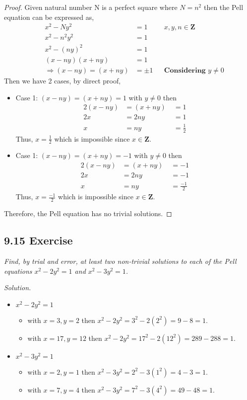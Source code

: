 \documentclass{article}
\begin{document}
\begin{proof}
Given natural number N is a perfect square where $N = n^2$ then the Pell equation can be expressed as,
\begin{align*}
    &&x^2 - Ny^2 &= 1 && x,y,n \in \mathbf{Z}\\
    &&x^2 - n^2y^2 &= 1 &&\\
    &&x^2 - (ny)^2 &= 1 &&\\
    &&(x - ny)(x + ny) &= 1 &&\\
    &&\Longrightarrow (x - ny) = (x + ny) &= \pm 1&& \textbf{Considering $y \neq 0$}
\end{align*}
Then we have 2 cases, by direct proof,
\begin{itemize}
    \item Case 1: $(x - ny) = (x + ny) = 1$ with $y \neq 0$ then
    \begin{alignat*}{2}
        (x - ny) &= (x+ny) \;&= 1\\
        2x &= 2ny \;&= 1\\
        x &= ny \;&= \frac{1}{2}
    \end{alignat*}
    Thus, $x = \frac{1}{2} $ which is impossible since $x \in \mathbf{Z}$.
    \item Case 1: $(x - ny) = (x + ny) = -1$ with $y \neq 0$ then
    \begin{alignat*}{2}
        (x - ny) &= (x+ny) \;&= -1\\
        2x &= 2ny \;&= -1\\
        x &= ny \;&= \frac{-1}{2}
    \end{alignat*}
    Thus, $x = \frac{-1}{2} $ which is impossible since $x \in \mathbf{Z}$.
\end{itemize}
Therefore, the Pell equation has no trivial solutions.
\end{proof}

\subsection*{9.15 Exercise} 
\quad \textit{Find, by trial and error, at least two non-trivial solutions to each of the Pell equations $x^2-2y^2=1$ and $x^2-3y^2=1$.}

\textit{Solution.}
\begin{itemize}
    \item $x^2-2y^2=1$ 
    \begin{itemize}
        \item with $x = 3, y = 2$ then $x^2-2y^2= 3^2-2(2^2) = 9 - 8 = 1$.
        \item with $x = 17, y = 12$ then $x^2-2y^2= 17^2-2(12^2) = 289 - 288 = 1$.
    \end{itemize}
    \item $x^2-3y^2=1$
    \begin{itemize}
        \item with $x = 2, y = 1$ then $x^2-3y^2 = 2^2-3(1^2) = 4 - 3 = 1$.
        \item with $x = 7, y = 4$ then $x^2-3y^2 = 7^2-3(4^2) = 49 - 48 = 1$.
    \end{itemize}
\end{itemize}
\end{document}
